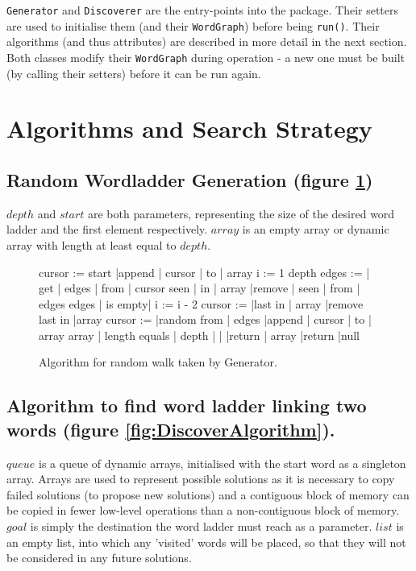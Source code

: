\documentclass[11pt]{article} %
\begin{document}
\texttt{Generator} and \texttt{Discoverer} are the entry-points into the package. Their setters are used to initialise them (and their \texttt{WordGraph}) before being \texttt{run()}. Their algorithms (and thus attributes) are described in more detail in the next section. Both classes modify their \texttt{WordGraph} during operation - a new one must be built (by calling their setters) before it can be run again.

\section{Algorithms and Search Strategy}

\subsection{Random Wordladder Generation (figure \ref{fig:GeneratorAlgorithm}) } 
$depth$ and $start$ are both parameters, representing the size of the desired word ladder and the first element respectively. $array$ is an empty array or dynamic array with length at least equal to $depth$.

\begin{figure}[h!!]
\caption{Algorithm for random walk taken by Generator.}
\begin{program}
\BEGIN
cursor := start
|append | cursor | to | array
\FOR i := 1 \TO depth \DO
	edges := | get | edges | from | cursor 
	\FOR seen | in | array \DO
		|remove | seen | from | edges  
	\OD
	\IF edges | is empty| \THEN 
		i := i - 2 
		cursor := |last in | array
		|remove last in |array
	\ELSE
		cursor := |random from | edges 
		|append | cursor | to | array 
	\FI
\OD
\IF array | length equals | depth | |\THEN
	|return | array 
\ELSE
	|return |null 
\FI
	
\END	
\end{program}

\label{fig:GeneratorAlgorithm}
\end{figure}

\subsection{Algorithm to find word ladder linking two words (figure \ref{fig:DiscoverAlgorithm}).}
$queue$ is a queue of dynamic arrays, initialised with the start word as a singleton array. Arrays are used to represent possible solutions as it is necessary to copy failed solutions (to propose new solutions) and a contiguous block of memory can be copied in fewer low-level operations than a non-contiguous block of memory. $goal$ is simply the destination the word ladder must reach as a parameter. $list$ is an empty list, into which any 'visited' words will be placed, so that they will not be considered in any future solutions.
\end{document}
